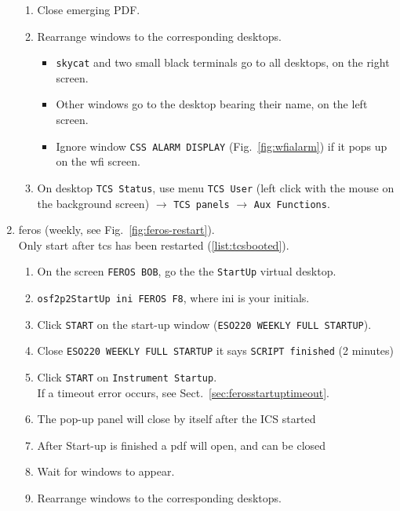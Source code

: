 \documentclass[11pt,fleqn]{book} %
\begin{document}
\begin{enumerate}
\begin{enumerate}
          \item Close emerging PDF.
          \item Rearrange windows to the corresponding desktops.
             \begin{itemize}
                \item \texttt{skycat} and two small black terminals go to all desktops, on the right screen.
                \item Other windows go to the desktop bearing their name, on the left screen. 
                \item Ignore window \texttt{CSS ALARM DISPLAY} (Fig.~\ref{fig:wfialarm}) if it pops up on the \gls{wfi} screen.                
             \end{itemize}
          \item On desktop \texttt{TCS Status}, use menu \texttt{TCS User} (left click with the mouse on the background screen) $\rightarrow$  \texttt{TCS panels} $\rightarrow$ \texttt{Aux Functions}.          
        \end{enumerate}
  \item \gls{feros} (weekly, see Fig.~\ref{fig:feros-restart}).\\
        Only start after \gls{tcs} has been restarted (\ref{list:tcsbooted}).
        \label{list:feros}
        \begin{enumerate}
         \item On the screen \texttt{FEROS BOB},  go the the \texttt{StartUp} virtual desktop.
         \item \texttt{osf2p2StartUp ini FEROS F8}, where ini is your initials.
         \item Click \texttt{START} on the start-up window (\texttt{ESO220 WEEKLY FULL STARTUP}).
         \item Close \texttt{ESO220 WEEKLY FULL STARTUP} it says \texttt{SCRIPT finished} (2 minutes)
         \item Click \texttt{START} on \texttt{Instrument Startup}.\\
               If a timeout error occurs, see Sect.~\ref{sec:ferosstartuptimeout}.     
         \item The pop-up panel will close by itself after the ICS started    
         \item After Start-up is finished a pdf will open, and can be closed     
         \item Wait for windows to appear.
         \item Rearrange windows to the corresponding desktops.

\end{enumerate}
\end{enumerate}
\end{document}
